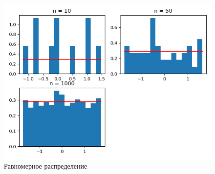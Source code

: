 \documentclass[a4]{article}
\begin{document}
\begin{center}
\begin{figure}
					\includegraphics[width=\textwidth]{uniform1.png}
					\caption[Равномерное распределение]{Равномерное распределение}
				\end{figure}
				
		\end{center}
		\newpage
\end{document}
